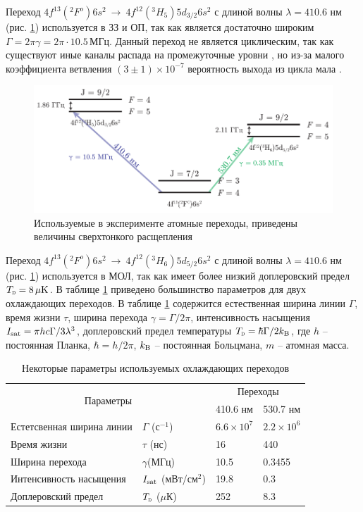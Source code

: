




Переход $4f^{13}({}^2F^o)6 s^2 \ \to\ 4f^{12}({}^3H_5)5d_{3/2}6s^2$ с длиной волны $\lambda = 410.6$ нм (рис. \ref{fig:Tm}) используется в ЗЗ и ОП, так как является достаточно широким $\Gamma = 2 \pi \gamma = 2\pi \cdot 10.5\, \text{МГц}$. Данный переход не является циклическим, так как существуют иные каналы распада на промежуточные уровни \cite{vlad}, но из-за малого коэффициента ветвления $(3\pm1)\times 10^{-7}$ вероятность выхода из цикла мала \cite{Kolachevsky2007}.


\begin{figure}[h]
    \centering
    \includegraphics{figs/tm.pdf}
    \caption{Используемые в эксперименте атомные переходы, приведены величины сверхтонкого расщепления \cite{Kolachevsky2007}}
    \label{fig:Tm}
\end{figure}


Переход $4f^{13}({}^2F^o)6 s^2 \ \to\ 4f^{12}({}^3H_6)5d_{5/2}6s^2$ с длиной волны $\lambda = 410.6$ нм (рис. \ref{fig:Tm}) используется в МОЛ, так как имеет более низкий доплеровский предел  $\subt{T}{D} = 8\, \mu\text{K}$. В таблице \ref{tab:tm} приведено большинство параметров для двух охлаждающих переходов. В таблице \ref{tab:tm} содержится естественная ширина линии $\Gamma$, время жизни $\tau$, ширина перехода $\gamma = \Gamma / 2\pi$, интенсивность насыщения $I_{\textnormal{sat}} = \pi h c \Gamma / 3 \lambda^3$, доплеровский предел температуры $\subt{T}{D} = \hbar \Gamma / 2 \kB$, где $h$ -- постоянная Планка, $\hbar = h / 2\pi$, $k_{\textnormal{B}}$ -- постоянная Больцмана, $m$ -- атомная масса.

\begin{table}[h]
	\caption{Некоторые параметры используемых охлаждающих переходов}
	\label{tab:tm}
	\centering
	\begin{tabular}{ll|ll}
	\toprule
	\multicolumn{2}{c}{\multirow{2}{*}{Параметры}} & \multicolumn{2}{c}{Переходы} \\
	&& 410.6 нм &  530.7 нм \\
	\midrule
	Естетсвенная ширина линии & $\Gamma$ (с${}^{-1}$) & $6.6 \times 10^7$ & $2.2 \times 10^6$ \\
	Время жизни & $\tau$ (нс) & 16 & 440 \\
	Ширина перехода  & $\gamma$(МГц) & 10.5 & 0.3455 \\
	Интенсивность насыщения & $I_{\textnormal{sat}}$ (мВт/см${}^2$) & 19.8 & 0.3 \\
	Доплеровский предел & $\subt{T}{D}$ ($\mu$К) & 252 & 8.3 \\
	\bottomrule
	\end{tabular}
\end{table}


% 	